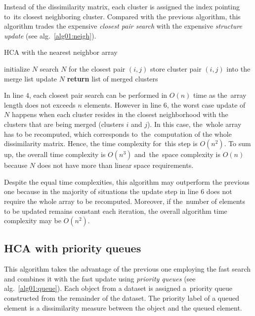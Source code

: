 Instead of the dissimilarity matrix, each cluster is assigned the index pointing to~its closest neighboring cluster. 
Compared with the previous algorithm, this algorithm trades the expensive \emph{closest pair search} with the expensive \emph{structure update}  (see alg.~\ref{alg01:neigh}).



\begin{algorithm}[t]
	\caption{HCA with the nearest neighbor array}
	\label{alg01:neigh}
	\begin{algorithmic}[1]
		\State initialize $N$
		\State search $N$ for the closest pair $(i,j)$ 
		\State store cluster pair $(i,j)$ into the merge list 
		\State update $N$ 
		\EndFor
		\State \textbf{return} list of merged clusters
		\EndProcedure
	\end{algorithmic}
\end{algorithm}


In line $4$, each closest pair search can be performed in $O(n)$ time as the~array length does not exceeds $n$ elements. However in line $6$, the worst case update of $N$ happens when each cluster resides in the closest neighborhood with the clusters that are being merged (clusters $i$  and $j$). In this case, the~whole array has to be recomputed, which corresponds to~the~computation of the whole dissimilarity matrix. Hence, the time complexity for~this step is $O(n^2)$. To sum up, the overall time complexity is $O(n^3)$ and~the~space complexity is $O(n)$ because $N$ does not have more than linear space requirements.

Despite the equal time complexities, this algorithm may outperform the previous one because in the majority of situations the update step in line $6$ does not require the whole array to be recomputed. Moreover, if the~number of elements to be updated remains constant each iteration, the overall algorithm time complexity may be $O(n^2)$. 

\subsection{HCA with priority queues}

This algorithm takes the advantage of the previous one employing the fast search and combines it with the fast update using \emph{priority queues} (see alg.~\ref{alg01:queue}).
Each object from a dataset is assigned a~priority queue constructed from the remainder of the dataset. The priority label of a queued element is a dissimilarity measure between the object and the queued element. 

